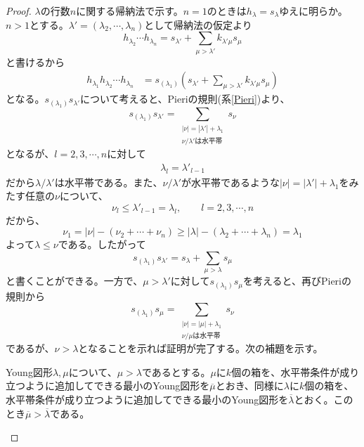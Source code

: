\documentclass{ltjsreport}
\begin{document}
\begin{proof}
    $\lambda$の行数$n$に関する帰納法で示す。$n=1$のときは$h_\lambda=s_\lambda$ゆえに明らか。$n>1$とする。$\lambda'=(\lambda_2,\cdots,\lambda_n)$として帰納法の仮定より
    \[
    h_{\lambda_2}\cdots h_{\lambda_n}=s_{\lambda'}+\sum_{\mu>\lambda'}k_{\lambda'\mu}s_\mu    
    \]
    と書けるから
    \begin{align*}
        h_{\lambda_1}h_{\lambda_2}\cdots h_{\lambda_n}
        &=s_{(\lambda_1)}\left(s_{\lambda'}+\sum_{\mu>\lambda'}k_{\lambda'\mu}s_\mu \right)
    \end{align*}
    となる。$s_{(\lambda_1)}s_{\lambda'}$について考えると、Pieriの規則(系\ref{Pieri})より、
    \[
        s_{(\lambda_1)}s_{\lambda'}=\sum_{\substack{|\nu|=|\lambda'|+\lambda_1\\\nu/\lambda'\text{は水平帯}}}s_\nu 
    \]
    となるが、$l=2,3,\cdots,n$に対して
    \begin{align*}
        \lambda_l=\lambda'_{l-1}
    \end{align*}
    だから$\lambda/\lambda'$は水平帯である。また、$\nu/\lambda'$が水平帯であるような$|\nu|=|\lambda'|+\lambda_1$をみたす任意の$\nu$について、
    \[
    \nu_l\leq\lambda'_{l-1}=\lambda_l,\qquad l=2,3,\cdots,n
    \]
    だから、
    \[
    \nu_1=|\nu|-(\nu_2+\cdots+\nu_n)\geq |\lambda|-(\lambda_2+\cdots+\lambda_n)=\lambda_1    
    \]
    よって$\lambda\leq \nu$である。したがって
    \[
        s_{(\lambda_1)}s_{\lambda'}=s_{\lambda}+\sum_{\mu>\lambda}s_\mu
    \]
    と書くことができる。一方で、$\mu>\lambda'$に対して$s_{(\lambda_1)}s_\mu$を考えると、再びPieriの規則から
    \begin{equation}\label{tmp}
    s_{(\lambda_1)}s_\mu=\sum_{\substack{|\nu|=|\mu|+\lambda_1 \\ \nu/\mu\text{は水平帯}}}s_\nu
    \end{equation}
    であるが、$\nu>\lambda$となることを示れば証明が完了する。次の補題を示す。
    \begin{lemm}
        Young図形$\lambda,\mu$について、$\mu>\lambda$であるとする。$\mu$に$k$個の箱を、水平帯条件が成り立つように追加してできる最小のYoung図形を$\overline{\mu}$とおき、同様に$\lambda$に$k$個の箱を、水平帯条件が成り立つように追加してできる最小のYoung図形を$\overline{\lambda}$とおく。このとき$\overline{\mu}>\overline{\lambda}$である。
    \end{lemm}


\end{proof}
\end{document}
